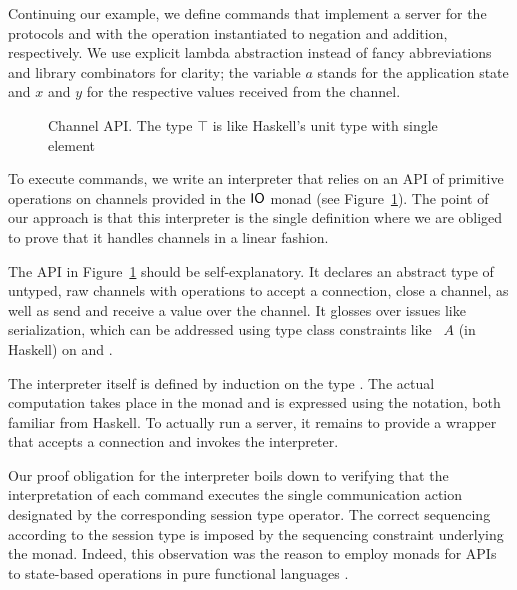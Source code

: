 \documentclass[acmsmall,review,anonymous,screen]{acmart}
\begin{document}
Continuing our example, we define commands that implement a server
for the protocols {\Aunaryp} and {\Abinaryp} with the operation instantiated to
negation and addition, respectively.
\stNegpCommand
\stAddpCommand  
 We use explicit lambda abstraction instead of fancy abbreviations and library combinators
for clarity; the variable $a$ stands for the application state and $x$ and $y$ for
the respective values received from the channel.

\begin{figure}[tp]
\stPostulates  
  \caption{Channel API. The type $\top$ is like
  Haskell's unit type with single element {\Att}}
  \label{fig:channel-api}
\end{figure}
To execute commands, we write an
interpreter that relies on an API of primitive operations on channels provided
in the $\AIO$ monad (see Figure~\ref{fig:channel-api}). The point of our approach is that this
interpreter is the single definition where we are obliged to prove
that it handles channels in a linear fashion. 

The API in Figure~\ref{fig:channel-api} should be self-explanatory. It declares an abstract type of
untyped, raw channels with operations to accept a connection, close a channel, as
well as send and receive a value over the channel. It glosses over issues like
serialization, which can be addressed using type class constraints like
{\ASerialize~$A$} (in Haskell) on {\AprimSend} and {\AprimRecv}.

The interpreter itself is defined by induction on the type
{\ACommand}. The actual computation takes place in the {\AIO} monad and is expressed using the {\Ado} notation, both
familiar from Haskell. 
\stExecutorSignature\vspace{-1.5\baselineskip}
\stExecutor
To actually run a server, it remains to provide a wrapper that accepts
a connection and invokes the interpreter.
\stAcceptor

Our proof obligation for the interpreter boils down to verifying that
the interpretation of each command executes the single communication
action designated by the corresponding session type operator. The
correct sequencing according to the session type is imposed by the
sequencing constraint underlying the {\AIO} monad. Indeed, this
observation was the reason to employ monads for APIs to state-based
operations in pure functional languages \cite{DBLP:conf/popl/JonesW93}.
\end{document}
